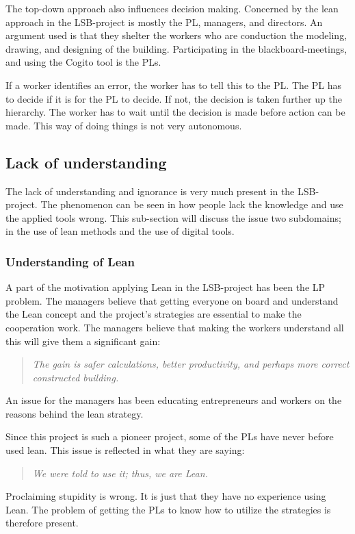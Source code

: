 The top-down approach also influences decision making. Concerned by the lean approach in the LSB-project is mostly the PL, managers, and directors. An argument used is that they shelter the workers who are conduction the modeling, drawing, and designing of the building. Participating in the blackboard-meetings, and using the Cogito tool is the PLs. 

If a worker identifies an error, the worker has to tell this to the PL. The PL has to decide if it is for the PL to decide. If not, the decision is taken further up the hierarchy. The worker has to wait until the decision is made before action can be made. This way of doing things is not very autonomous. 

\subsection{Lack of understanding}
The lack of understanding and ignorance is very much present in the LSB-project. The phenomenon can be seen in how people lack the knowledge and use the applied tools wrong. This sub-section will discuss the issue two subdomains; in the use of lean methods and the use of digital tools. 

\subsubsection{Understanding of Lean}
A part of the motivation applying Lean in the LSB-project has been the LP problem. The managers believe that getting everyone on board and understand the Lean concept and the project's strategies are essential to make the cooperation work. The managers believe that making the workers understand all this will give them a significant gain: 
\begin{quote}
 \textit{The gain is safer calculations, better productivity, and perhaps more correct constructed building.}
\end{quote}

An issue for the managers has been educating entrepreneurs and workers on the reasons behind the lean strategy.

Since this project is such a pioneer project, some of the PLs have never before used lean. This issue is reflected in what they are saying: 
\begin{quote}
 \textit{We were told to use it; thus, we are Lean.}
\end{quote}

Proclaiming stupidity is wrong. It is just that they have no experience using Lean. The problem of getting the PLs to know how to utilize the strategies is therefore present.


